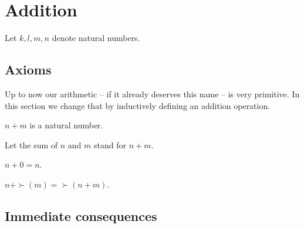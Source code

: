 \documentclass[../../arithmetic.ftl.tex]{subfiles}
\begin{document}
  \begin{comment}
    \begin{forthel}

    \end{forthel}
  \end{comment}


  \section{Addition}

  \begin{forthel}
  \end{forthel}

  \begin{forthel}
    Let $k, l, m, n$ denote natural numbers.
  \end{forthel}


  \subsection{Axioms}

  Up to now our arithmetic -- if it already deserves this name -- is very
  primitive. In this section we change that by inductively defining an addition
  operation.

  \begin{forthel}
    \begin{signature}
      $n + m$ is a natural number.
    \end{signature}

    Let the sum of $n$ and $m$ stand for $n + m$.

    \begin{axiom}\label{Arithmetic_01_02_190669}
      $n + 0 = n$.
    \end{axiom}

    \begin{axiom}\label{Arithmetic_01_02_110889}
      $n + \succ(m) = \succ(n + m)$.
    \end{axiom}
  \end{forthel}


  \subsection{Immediate consequences}
\end{document}
